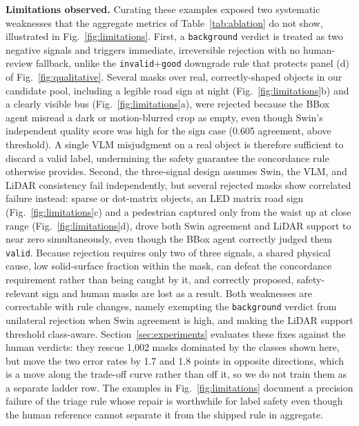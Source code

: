 \documentclass[conference]{IEEEtran}
\begin{document}
\textbf{Limitations observed.} Curating these examples exposed two systematic weaknesses that the aggregate metrics of Table~\ref{tab:ablation} do not show, illustrated in Fig.~\ref{fig:limitations}. First, a \texttt{background} verdict is treated as two negative signals and triggers immediate, irreversible rejection with no human-review fallback, unlike the \texttt{invalid}+\texttt{good} downgrade rule that protects panel (d) of Fig.~\ref{fig:qualitative}. Several masks over real, correctly-shaped objects in our candidate pool, including a legible road sign at night (Fig.~\ref{fig:limitations}b) and a clearly visible bus (Fig.~\ref{fig:limitations}a), were rejected because the BBox agent misread a dark or motion-blurred crop as empty, even though Swin's independent quality score was high for the sign case (0.605 agreement, above threshold). A single VLM misjudgment on a real object is therefore sufficient to discard a valid label, undermining the safety guarantee the concordance rule otherwise provides.
Second, the three-signal design assumes Swin, the VLM, and LiDAR consistency fail independently, but several rejected masks show correlated failure instead: sparse or dot-matrix objects, an LED matrix road sign (Fig.~\ref{fig:limitations}c) and a pedestrian captured only from the waist up at close range (Fig.~\ref{fig:limitations}d), drove both Swin agreement and LiDAR support to near zero simultaneously, even though the BBox agent correctly judged them \texttt{valid}. Because rejection requires only two of three signals, a shared physical cause, low solid-surface fraction within the mask, can defeat the concordance requirement rather than being caught by it, and correctly proposed, safety-relevant sign and human masks are lost as a result. Both weaknesses are correctable with rule changes, namely exempting the \texttt{background} verdict from unilateral rejection when Swin agreement is high, and making the LiDAR support threshold class-aware. Section~\ref{sec:experiments} evaluates these fixes against the human verdicts: they rescue 1{,}002 masks dominated by the classes shown here, but move the two error rates by 1.7 and 1.8 points in opposite directions, which is a move along the trade-off curve rather than off it, so we do not train them as a separate ladder row. The examples in Fig.~\ref{fig:limitations} document a precision failure of the triage rule whose repair is worthwhile for label safety even though the human reference cannot separate it from the shipped rule in aggregate.
\end{document}
